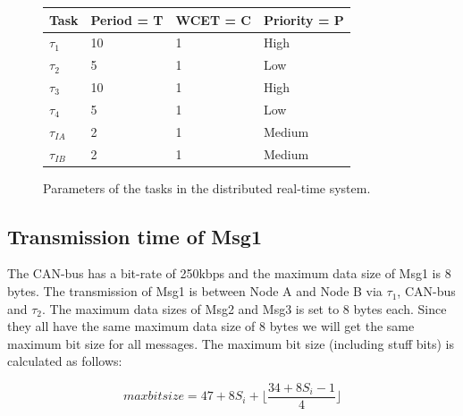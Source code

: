     \renewcommand{\arraystretch}{1.4}
        \begin{figure}[H]
        \centering
        \begin{minipage}{0.5\textwidth}
            \begin{table}[H]
            \centering
            \begin{tabular}{|l|l|l|l|}
                \hline
                \textbf{Task}   & \textbf{Period = T}   & \textbf{WCET = C} & \textbf{Priority = P} \\ \hline
                $\tau_1$        & 10                    & 1                 & High                  \\ \hline
                $\tau_2$        & 5                     & 1                 & Low                   \\ \hline
                $\tau_3$        & 10                    & 1                 & High                  \\ \hline
                $\tau_4$        & 5                     & 1                 & Low                   \\ \hline
                $\tau_{IA}$     & 2                     & 1                 & Medium                \\ \hline
                $\tau_{IB}$     & 2                     & 1                 & Medium                \\ \hline
            \end{tabular}
            \end{table}
        \end{minipage}
        \caption{Parameters of the tasks in the distributed real-time system.}
        \label{fig:taskparameters}
        \end{figure}
    \renewcommand{\arraystretch}{1.0}

    \subsection*{\textbf{Transmission time of Msg1}}
        The CAN-bus has a bit-rate of 250kbps and the maximum data size of Msg1 is 8 bytes. The transmission of Msg1 is between Node A and Node B via $\tau_1$, CAN-bus and $\tau_2$. The maximum data sizes of Msg2 and Msg3 is set to 8 bytes each. Since they all have the same maximum data size of 8 bytes we will get the same maximum bit size for all messages. The maximum bit size (including stuff bits) is calculated as follows:

        $$maxbitsize = 47+8S_i+\lfloor\frac{34+8S_i-1}{4}\rfloor$$
        
